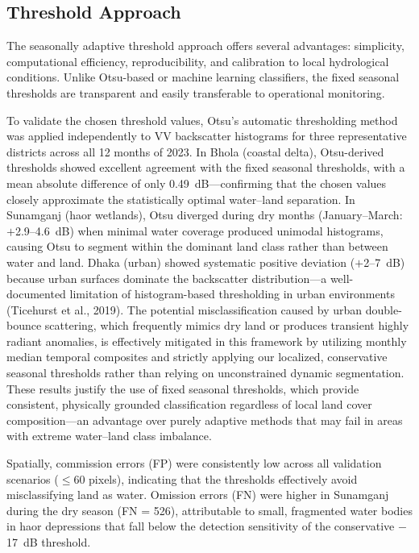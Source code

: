\documentclass[fleqn,10pt]{article}
\begin{document}
\subsection{Threshold Approach}
The seasonally adaptive threshold approach offers several advantages: simplicity, computational efficiency, reproducibility, and calibration to local hydrological conditions. Unlike Otsu-based or machine learning classifiers, the fixed seasonal thresholds are transparent and easily transferable to operational monitoring.

To validate the chosen threshold values, Otsu's automatic thresholding method was applied independently to VV backscatter histograms for three representative districts across all 12 months of 2023. In Bhola (coastal delta), Otsu-derived thresholds showed excellent agreement with the fixed seasonal thresholds, with a mean absolute difference of only 0.49~dB---confirming that the chosen values closely approximate the statistically optimal water--land separation. In Sunamganj (haor wetlands), Otsu diverged during dry months (January--March: $+$2.9--4.6~dB) when minimal water coverage produced unimodal histograms, causing Otsu to segment within the dominant land class rather than between water and land. Dhaka (urban) showed systematic positive deviation ($+$2--7~dB) because urban surfaces dominate the backscatter distribution---a well-documented limitation of histogram-based thresholding in urban environments (Ticehurst et al., 2019). The potential misclassification caused by urban double-bounce scattering, which frequently mimics dry land or produces transient highly radiant anomalies, is effectively mitigated in this framework by utilizing monthly median temporal composites and strictly applying our localized, conservative seasonal thresholds rather than relying on unconstrained dynamic segmentation. These results justify the use of fixed seasonal thresholds, which provide consistent, physically grounded classification regardless of local land cover composition---an advantage over purely adaptive methods that may fail in areas with extreme water--land class imbalance.

Spatially, commission errors (FP) were consistently low across all validation scenarios ($\leq$60 pixels), indicating that the thresholds effectively avoid misclassifying land as water. Omission errors (FN) were higher in Sunamganj during the dry season (FN = 526), attributable to small, fragmented water bodies in haor depressions that fall below the detection sensitivity of the conservative $-$17~dB threshold.
\end{document}
